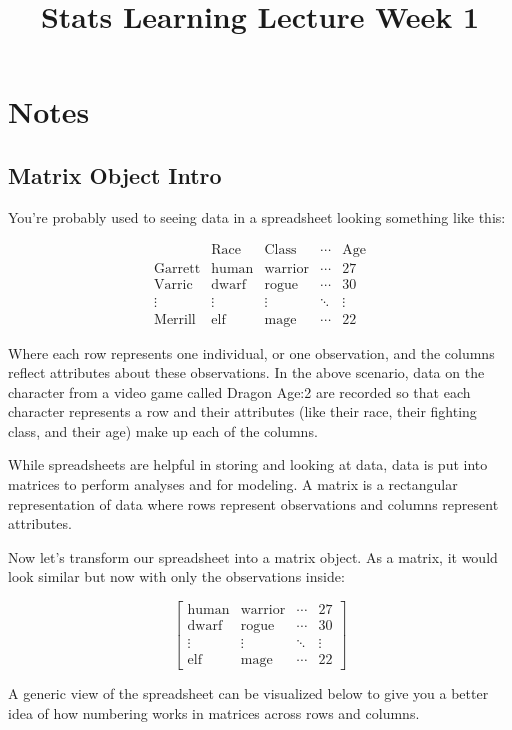 \documentclass[a4paper]{article}
\title{Stats Learning Lecture Week 1}
\begin{document}
\section{Notes}
  \subsection{Matrix Object Intro}
  You're probably used to seeing data in a spreadsheet looking something like this:

    $$\begin{matrix}
    & \text{Race} & \text{Class} & \cdots & \text{Age}\\
    \text{Garrett} & \text{human} & \text{warrior} & \cdots & 27\\
    \text{Varric} & \text{dwarf} & \text{rogue} & \cdots & 30\\
    \vdots & \vdots & \vdots & \ddots & \vdots \\
    \text{Merrill} & \text{elf} & \text{mage} & \cdots & 22
    \end{matrix}$$

  Where each row represents one individual, or one observation, and the columns reflect attributes about these observations. In the above scenario, data on the character from a video game called Dragon Age:2 are recorded so that each character represents a row and their attributes (like their race, their fighting class, and their age) make up each of the columns.

  While spreadsheets are helpful in storing and looking at data, data is put into matrices to perform analyses and for modeling. A matrix is a rectangular representation of data where rows represent observations and columns represent attributes.

  Now let's transform our spreadsheet into a matrix object. As a matrix, it would look similar but now with only the observations inside:

    $$\begin{bmatrix}
    \text{human} & \text{warrior} & \cdots & 27\\
    \text{dwarf} & \text{rogue} & \cdots & 30\\
    \vdots & \vdots & \ddots & \vdots \\
    \text{elf} & \text{mage} & \cdots & 22
    \end{bmatrix}$$

  A generic view of the spreadsheet can be visualized below to give you a better idea of how numbering works in matrices across rows and columns.
\end{document}

